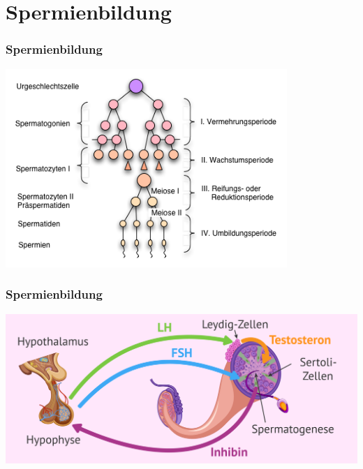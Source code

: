 \documentclass{beamer}
\begin{document}


 \section{Spermienbildung}


\begin{frame}
\frametitle{Spermienbildung}



\begin{center}
\includegraphics[width=0.8\textwidth]{Spermatogenese.png}
\end{center}

\end{frame}


\begin{frame}
\frametitle{Spermienbildung}


\begin{center}
\includegraphics[width=\textwidth]{hormonelle-regulierung-spermatogenese.png}

\end{center}


\end{frame}
\end{document}
